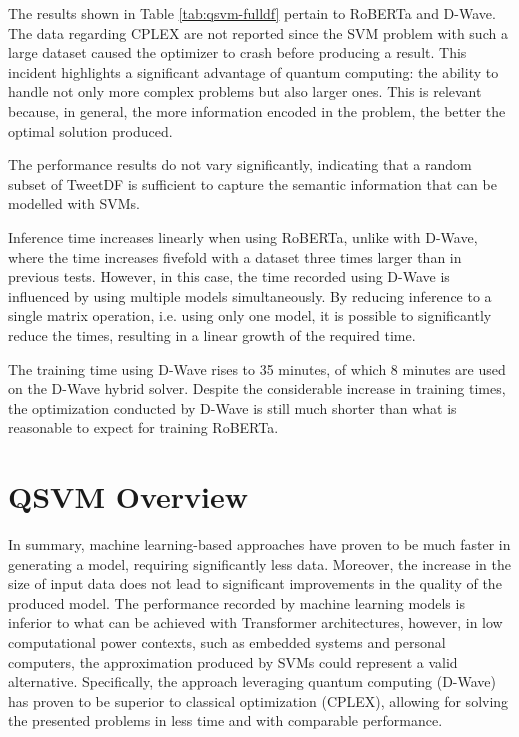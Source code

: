 The results shown in Table \ref{tab:qsvm-fulldf} pertain to RoBERTa and D-Wave. The data regarding CPLEX are not reported since the SVM problem with such a large dataset caused the optimizer to crash before producing a result. This incident highlights a significant advantage of quantum computing: the ability to handle not only more complex problems but also larger ones. This is relevant because, in general, the more information encoded in the problem, the better the optimal solution produced.

The performance results do not vary significantly, indicating that a random subset of TweetDF is sufficient to capture the semantic information that can be modelled with SVMs.

Inference time increases linearly when using RoBERTa, unlike with D-Wave, where the time increases fivefold with a dataset three times larger than in previous tests. However, in this case, the time recorded using D-Wave is influenced by using multiple models simultaneously. By reducing inference to a single matrix operation, i.e. using only one model, it is possible to significantly reduce the times, resulting in a linear growth of the required time.

The training time using D-Wave rises to 35 minutes, of which 8 minutes are used on the D-Wave hybrid solver. Despite the considerable increase in training times, the optimization conducted by D-Wave is still much shorter than what is reasonable to expect for training RoBERTa.

\section{QSVM Overview}

In summary, machine learning-based approaches have proven to be much faster in generating a model, requiring significantly less data. Moreover, the increase in the size of input data does not lead to significant improvements in the quality of the produced model. The performance recorded by machine learning models is inferior to what can be achieved with Transformer architectures, however, in low computational power contexts, such as embedded systems and personal computers, the approximation produced by SVMs could represent a valid alternative. Specifically, the approach leveraging quantum computing (D-Wave) has proven to be superior to classical optimization (CPLEX), allowing for solving the presented problems in less time and with comparable performance.
